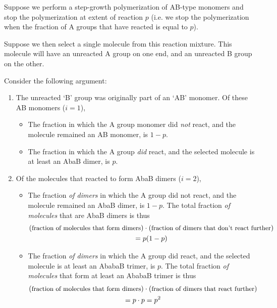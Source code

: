 \begin{activity}
\begin{instructornotes}
\end{instructornotes}


\begin{model}

Suppose we perform a step-growth polymerization of AB-type monomers and stop the polymerization at extent of reaction $p$ (i.e. we stop the polymerization when the fraction of A groups that have reacted is equal to $p$).

Suppose we then select a single molecule from this reaction mixture.  This molecule will have an unreacted A group on one end, and an unreacted B group on the other.

Consider the following argument:
\begin{enumerate}
\item The unreacted `B' group was originally part of an `AB' monomer. Of these AB monomers ($i=1$),
\begin{itemize}
	\item The fraction in which the A group monomer did \textit{not} react, and the molecule remained an AB monomer, is $1-p$.

	\item The fraction in which the A group \textit{did} react, and the selected molecule is at least an AbaB dimer, is $p$.
\end{itemize}

\item Of the molecules that reacted to form AbaB dimers ($i=2$),
\begin{itemize}
	\item The fraction \emph{of dimers} in which the A group did not react, and the molecule remained an AbaB dimer, is $1-p$. The total fraction \emph{of molecules} that are AbaB dimers is thus 
	\begin{gather*}(\text{\small fraction of molecules that form dimers})\cdot(\text{\small fraction of dimers that don't react further})\\ =p(1-p)\end{gather*}

	\item The fraction \emph{of dimers} in which the A group did react, and the selected molecule is at least an AbabaB trimer, is $p$. The total fraction \emph{of molecules} that form at least an AbabaB trimer is thus 
	\begin{gather*}(\text{\small fraction of molecules that form dimers})\cdot(\text{\small fraction of dimers that react further}) \\= p\cdot p=p^2 \end{gather*}
\end{itemize}


\end{enumerate}
\end{model}
\end{activity}
